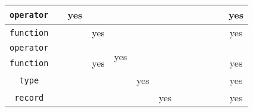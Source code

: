 \begin{center}
{\begin{tabular}{|c||c|c|c|c|c|c|c|c|c|c|c|c|}
    \hline
    {\lstinline!operator!}          &                          & yes                       &                                            &                      &                          &                          &                          &                          &                            &                          &                        & \cellcolor{lightgray}yes                   \\
    \hline
    {\lstinline!function!}          &                          &                           & yes                                        &                      &                          &                          &                          &                          &                            &                          &                        & \cellcolor{lightgray}yes                   \\
    \hline
    {\lstinline!operator!}          &                          &                           & \cellcolor{lightgray}                      & \multirow{2}{*}{yes} &                          &                          &                          &                          &                            &                          &                        & \cellcolor{lightgray}                      \\
    {\lstinline!function!}          &                          &                           & \multirow{-2}{*}{\cellcolor{lightgray}yes} &                      &                          &                          &                          &                          &                            &                          &                        & \multirow{-2}{*}{\cellcolor{lightgray}yes}  \\
    \hline
    {\lstinline!type!}              &                          &                           &                                            &                      & yes                      &                          &                          &                          &                            &                          &                        & \cellcolor{lightgray}yes                   \\
    \hline
    {\lstinline!record!}            &                          &                           &                                            &                      &                          & yes                      &                          &                          &                            &                          &                        & \cellcolor{lightgray}yes                   \\

\end{tabular}}
\end{center}
